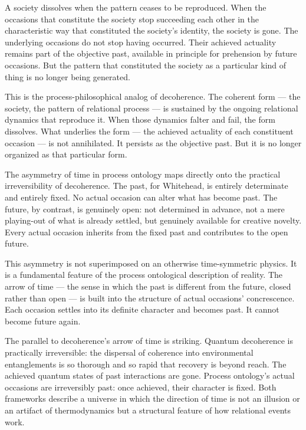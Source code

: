 A society dissolves when the pattern ceases to be reproduced.
When the occasions that constitute the society stop succeeding each other in the characteristic way that constituted the society's identity, the society is gone.
The underlying occasions do not stop having occurred.
Their achieved actuality remains part of the objective past, available in principle for prehension by future occasions.
But the pattern that constituted the society as a particular kind of thing is no longer being generated.

This is the process-philosophical analog of decoherence.
The coherent form --- the society, the pattern of relational process --- is sustained by the ongoing relational dynamics that reproduce it.
When those dynamics falter and fail, the form dissolves.
What underlies the form --- the achieved actuality of each constituent occasion --- is not annihilated.
It persists as the objective past.
But it is no longer organized as that particular form.

The asymmetry of time in process ontology maps directly onto the practical irreversibility of decoherence.
The past, for Whitehead, is entirely determinate and entirely fixed.
No actual occasion can alter what has become past.
The future, by contrast, is genuinely open: not determined in advance, not a mere playing-out of what is already settled, but genuinely available for creative novelty.
Every actual occasion inherits from the fixed past and contributes to the open future.

This asymmetry is not superimposed on an otherwise time-symmetric physics.
It is a fundamental feature of the process ontological description of reality.
The arrow of time --- the sense in which the past is different from the future, closed rather than open --- is built into the structure of actual occasions' concrescence.
Each occasion settles into its definite character and becomes past.
It cannot become future again.

The parallel to decoherence's arrow of time is striking.
Quantum decoherence is practically irreversible: the dispersal of coherence into environmental entanglements is so thorough and so rapid that recovery is beyond reach.
The achieved quantum states of past interactions are gone.
Process ontology's actual occasions are irreversibly past: once achieved, their character is fixed.
Both frameworks describe a universe in which the direction of time is not an illusion or an artifact of thermodynamics but a structural feature of how relational events work.

